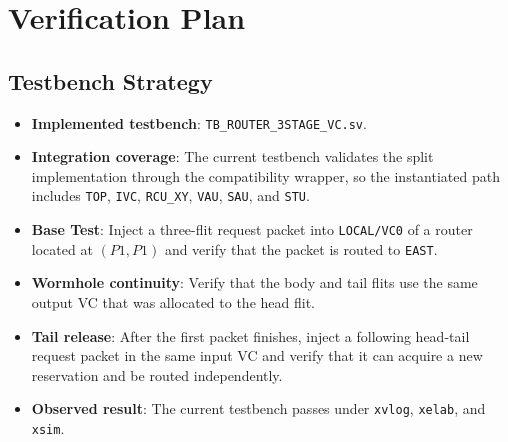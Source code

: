 \documentclass[11pt,a4paper]{article}
\begin{document}
\section{Verification Plan}
\subsection{Testbench Strategy}
\begin{itemize}
    \item \textbf{Implemented testbench}: \texttt{TB\_ROUTER\_3STAGE\_VC.sv}.
    \item \textbf{Integration coverage}: The current testbench validates the split implementation through the compatibility wrapper, so the instantiated path includes \texttt{TOP}, \texttt{IVC}, \texttt{RCU\_XY}, \texttt{VAU}, \texttt{SAU}, and \texttt{STU}.
    \item \textbf{Base Test}: Inject a three-flit request packet into \texttt{LOCAL/VC0} of a router located at \((P1,P1)\) and verify that the packet is routed to \texttt{EAST}.
    \item \textbf{Wormhole continuity}: Verify that the body and tail flits use the same output VC that was allocated to the head flit.
    \item \textbf{Tail release}: After the first packet finishes, inject a following head-tail request packet in the same input VC and verify that it can acquire a new reservation and be routed independently.
    \item \textbf{Observed result}: The current testbench passes under \texttt{xvlog}, \texttt{xelab}, and \texttt{xsim}.
\end{itemize}
\end{document}
